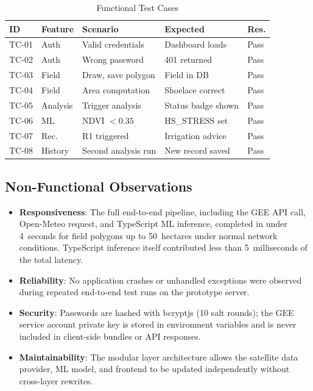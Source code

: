 \documentclass[conference]{IEEEtran}
\begin{document}
\begin{table}[!t]
\caption{Functional Test Cases}
\label{tab:tests}
\centering
\footnotesize
\setlength{\tabcolsep}{3pt}
\begin{tabular}{p{0.5cm}p{1.2cm}p{1.85cm}p{1.55cm}p{0.8cm}}
\toprule
\textbf{ID} & \textbf{Feature} & \textbf{Scenario} &
\textbf{Expected} & \textbf{Res.} \\
\midrule
TC-01 & Auth      & Valid credentials     & Dashboard loads      & Pass \\
TC-02 & Auth      & Wrong password        & 401 returned         & Pass \\
TC-03 & Field     & Draw, save polygon    & Field in DB          & Pass \\
TC-04 & Field     & Area computation      & Shoelace correct     & Pass \\
TC-05 & Analysis  & Trigger analysis      & Status badge shown   & Pass \\
TC-06 & ML        & NDVI $< 0.35$         & HS\_STRESS set       & Pass \\
TC-07 & Rec.      & R1 triggered          & Irrigation advice    & Pass \\
TC-08 & History   & Second analysis run   & New record saved     & Pass \\
\bottomrule
\end{tabular}
\end{table}

\subsection{Non-Functional Observations}

\begin{itemize}
\item \textbf{Responsiveness}: The full end-to-end pipeline, including
  the GEE API call, Open-Meteo request, and TypeScript ML inference,
  completed in under 4~seconds for field polygons up to 50~hectares under
  normal network conditions. TypeScript inference itself contributed less
  than 5~milliseconds of the total latency.
\item \textbf{Reliability}: No application crashes or unhandled exceptions
  were observed during repeated end-to-end test runs on the prototype
  server.
\item \textbf{Security}: Passwords are hashed with bcryptjs (10 salt
  rounds); the GEE service account private key is stored in environment
  variables and is never included in client-side bundles or API responses.
\item \textbf{Maintainability}: The modular layer architecture allows the
  satellite data provider, ML model, and frontend to be updated
  independently without cross-layer rewrites.
\end{itemize}
\end{document}
